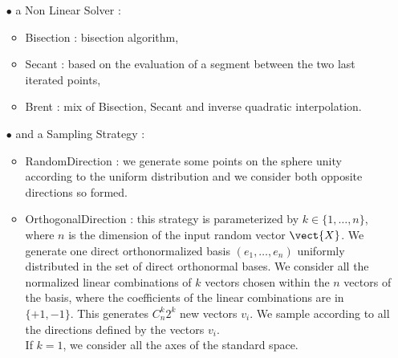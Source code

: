 {\begin{itemize}
  \item[$\bullet$] a Non Linear Solver :
    \begin{itemize}
    \item Bisection : bisection algorithm,
    \item Secant : based on the evaluation of a segment between the two last iterated points,
    \item Brent : mix of Bisection, Secant and inverse quadratic interpolation.
    \end{itemize}
  \item[$\bullet$] and a Sampling Strategy :
    \begin{itemize}
    \item RandomDirection : we generate some points on the sphere unity according to the uniform distribution and we consider both opposite directions so formed.
    \item OrthogonalDirection : this strategy is parameterized by $k\in \{1,\dots,n\}$, where $n$ is the dimension of the input random vector $\vect{X}$. We generate one direct orthonormalized basis $(e_1, \dots, e_n)$ uniformly distributed in the set of direct orthonormal bases. We consider all the normalized linear combinations of $k$ vectors chosen within the $n$ vectors of the basis, where the coefficients of the linear combinations are in $\{+1, -1\}$. This generates $C_n^k 2^k$ new vectors $v_i$. We sample according to all the directions defined by the vectors $v_i$.\\
      If $k=1$, we consider all the axes of the standard space.
    \end{itemize}
  \end{itemize}
}
{
}

